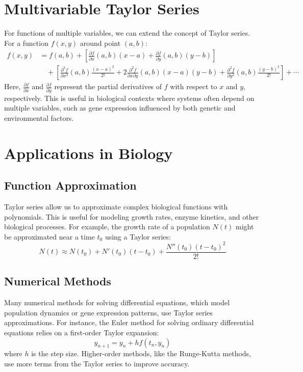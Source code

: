 \documentclass{article}
\begin{document}
\section{Multivariable Taylor Series}
For functions of multiple variables, we can extend the concept of Taylor series. For a function $f(x,y)$ around point $(a,b)$:
\begin{align}
f(x,y) &= f(a,b) + \left[\frac{\partial f}{\partial x}(a,b)(x-a) + \frac{\partial f}{\partial y}(a,b)(y-b)\right] \nonumber \\
&\quad + \left[\frac{\partial^2 f}{\partial x^2}(a,b)\frac{(x-a)^2}{2!} + 2\frac{\partial^2 f}{\partial x \partial y}(a,b)(x-a)(y-b) + \frac{\partial^2 f}{\partial y^2}(a,b)\frac{(y-b)^2}{2!}\right] + \cdots
\end{align}
Here, $\frac{\partial f}{\partial x}$ and $\frac{\partial f}{\partial y}$ represent the partial derivatives of $f$ with respect to $x$ and $y$, respectively. This is useful in biological contexts where systems often depend on multiple variables, such as gene expression influenced by both genetic and environmental factors.

\section{Applications in Biology}
\subsection{Function Approximation}
Taylor series allow us to approximate complex biological functions with polynomials. This is useful for modeling growth rates, enzyme kinetics, and other biological processes. For example, the growth rate of a population $N(t)$ might be approximated near a time $t_0$ using a Taylor series:
\begin{equation}
N(t) \approx N(t_0) + N'(t_0)(t-t_0) + \frac{N''(t_0)(t-t_0)^2}{2!}
\end{equation}

\subsection{Numerical Methods}
Many numerical methods for solving differential equations, which model population dynamics or gene expression patterns, use Taylor series approximations. For instance, the Euler method for solving ordinary differential equations relies on a first-order Taylor expansion:
\begin{equation}
y_{n+1} = y_n + h f(t_n, y_n)
\end{equation}
where $h$ is the step size. Higher-order methods, like the Runge-Kutta methods, use more terms from the Taylor series to improve accuracy.
\end{document}
